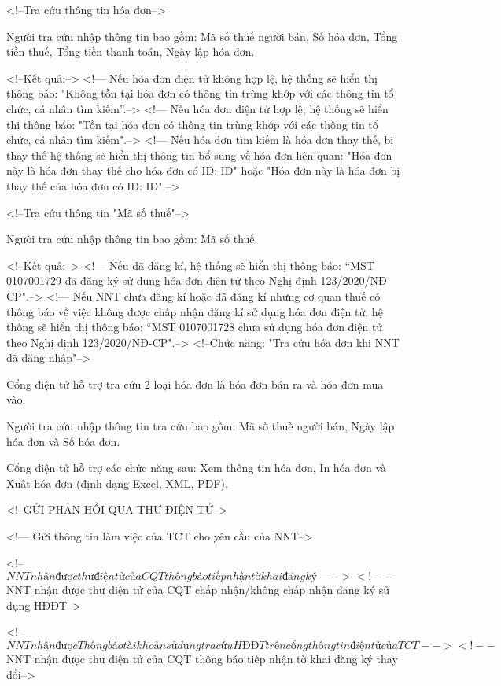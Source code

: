 <!--Tra cứu thông tin hóa đơn-->

Người tra cứu nhập thông tin bao gồm: Mã số thuế người bán, Số hóa đơn, Tổng tiền thuế, Tổng tiền thanh toán, Ngày lập hóa đơn.

<!--Kết quả:-->
<!--- Nếu hóa đơn điện tử không hợp lệ, hệ thống sẽ hiển thị thông báo: "Không tồn tại hóa đơn có thông tin trùng khớp với các thông tin tổ chức, cá nhân tìm kiếm”.-->
<!--- Nếu hóa đơn điện tử hợp lệ, hệ thống sẽ hiển thị thông báo: "Tồn tại hóa đơn có thông tin trùng khớp với các thông tin tổ chức, cá nhân tìm kiếm".-->
<!--- Nếu hóa đơn tìm kiếm là hóa đơn thay thế, bị thay thế hệ thống sẽ hiển thị thông tin bổ sung về hóa đơn liên quan: "Hóa đơn này là hóa đơn thay thế cho hóa đơn có ID: {{ID}}" hoặc "Hóa đơn này là hóa đơn bị thay thế của hóa đơn có ID: {{ID}}".-->

<!--Tra cứu thông tin "Mã số thuế"-->

Người tra cứu nhập thông tin bao gồm: Mã số thuế.

<!--Kết quả:-->
<!--- Nếu đã đăng kí, hệ thống sẽ hiển thị thông báo: “MST 0107001729 đã đăng ký sử dụng hóa đơn điện tử theo Nghị định 123/2020/NĐ-CP".-->
<!--- Nếu NNT chưa đăng kí hoặc đã đăng kí nhưng cơ quan thuế có thông báo về việc không được chấp nhận đăng kí sử dụng hóa đơn điện tử, hệ thống sẽ hiển thị thông báo: “MST 0107001728 chưa sử dụng hóa đơn điện tử theo Nghị định 123/2020/NĐ-CP".-->
<!--Chức năng: "Tra cứu hóa đơn khi NNT đã đăng nhập"-->

Cổng điện tử hỗ trợ tra cứu 2 loại hóa đơn là hóa đơn bán ra và hóa đơn mua vào.

Người tra cứu nhập thông tin tra cứu bao gồm: Mã số thuế người bán, Ngày lập hóa đơn và Số hóa đơn.

Cổng điện tử hỗ trợ các chức năng sau: Xem thông tin hóa đơn, In hóa đơn và Xuất hóa đơn (định dạng Excel, XML, PDF).

<!--GỬI PHẢN HỒI QUA THƯ ĐIỆN TỬ-->

<!--- Gửi thông tin làm việc của TCT cho yêu cầu của NNT-->

<!--$ NNT nhận được thư điện tử của CQT thông báo tiếp nhận tờ khai đăng ký-->

<!--$ NNT nhận được thư điện tử của CQT chấp nhận/không chấp nhận đăng ký sử dụng HĐĐT-->

<!--$ NNT nhận được Thông báo tài khoản sử dụng tra cứu HĐĐT trên cổng thông tin điện tử của TCT-->

<!--$ NNT nhận được thư điện tử của CQT thông báo tiếp nhận tờ khai đăng ký thay đổi-->

